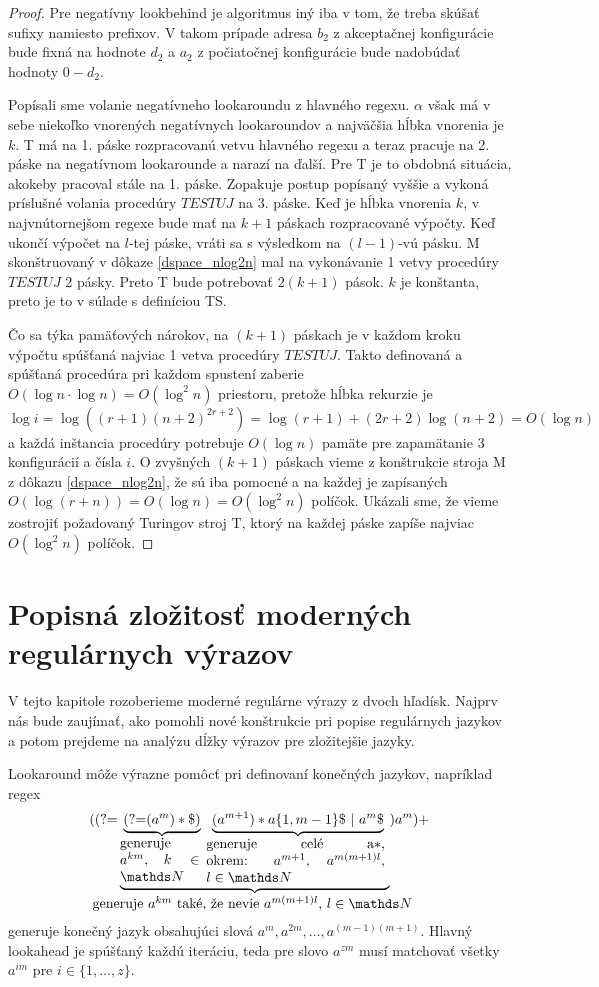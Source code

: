 \begin{proof}
Pre negatívny lookbehind je algoritmus iný iba v tom, že treba skúšať sufixy namiesto prefixov. V takom prípade adresa $b_2$ z akceptačnej konfigurácie bude fixná na hodnote $d_2$ a $a_2$ z počiatočnej konfigurácie bude nadobúdať hodnoty $0-d_2$.

Popísali sme volanie negatívneho lookaroundu z hlavného regexu. $\alpha$ však má v sebe niekoľko vnorených negatívnych lookaroundov a najväčšia hĺbka vnorenia je $k$. T má na 1. páske rozpracovanú vetvu hlavného regexu a teraz pracuje na 2. páske na negatívnom lookarounde a narazí na ďalší. Pre T je to obdobná situácia, akokeby pracoval stále na 1. páske. Zopakuje postup popísaný vyššie a vykoná príslušné volania procedúry $TESTUJ$ na 3. páske. Keď je hĺbka vnorenia $k$, v najvnútornejšom regexe bude mať na $k+1$ páskach rozpracované výpočty. Keď ukončí výpočet na $l$-tej páske, vráti sa s výsledkom na $(l-1)$-vú pásku. M skonštruovaný v dôkaze \ref{dspace_nlog2n} mal na vykonávanie 1 vetvy procedúry $TESTUJ$ 2 pásky. Preto T bude potrebovať $2(k+1)$ pások. $k$ je konštanta, preto je to v súlade s definíciou TS.

Čo sa týka pamäťových nárokov, na $(k+1)$ páskach je v každom kroku výpočtu spúšťaná najviac 1 vetva procedúry $TESTUJ$. Takto definovaná a spúšťaná procedúra pri každom spustení zaberie $O(\log n\cdot\log n) = O(\log ^2 n)$ priestoru, pretože hĺbka rekurzie je $$\log i = \log ((r+1)(n+2)^{2r+2}) = \log (r+1) + (2r+2)\log (n+2) = O(\log n)$$ a každá inštancia procedúry potrebuje $O(\log n)$ pamäte pre zapamätanie 3 konfigurácií a čísla $i$. O zvyšných $(k+1)$ páskach vieme z konštrukcie stroja M z dôkazu \ref{dspace_nlog2n}, že sú iba pomocné a na každej je zapísaných $O(\log (r+n)) = O(\log n) = O(\log^2 n)$ políčok. Ukázali sme, že vieme zostrojiť požadovaný Turingov stroj T, ktorý na každej páske zapíše najviac $O(\log^2 n)$ políčok.
\end{proof}

\section[Popisná zložitosť]{Popisná zložitosť moderných regulárnych výrazov}
\label{vzlozitost}

V tejto kapitole rozoberieme moderné regulárne výrazy z dvoch hľadísk. Najprv nás bude zaujímať, ako pomohli nové konštrukcie pri popise regulárnych jazykov a potom prejdeme na analýzu dĺžky výrazov pre zložitejšie jazyky.

Lookaround môže výrazne pomôcť pri definovaní konečných jazykov, napríklad regex 
$$(\lookahead 
\underbrace{
	\underbrace{
		\lookahead (a^m)*\$ )
	}_{ \text{\normalsize \parbox{2cm}{generuje $a^{km}$, $k\in\N$} } }
	\underbrace{
		(a^{m+1})* a\lbrace 1,m-1\rbrace \$ ~|~ a^m \$ 
	}_{ \text{\normalsize \parbox{4.5cm}{generuje celé a$*$, okrem: $a^{m+1}$, $a^{m(m+1)l}$, $l\in\N$} } }
}_{\mathclap{ \text{\normalsize generuje $a^{km}$ také, že nevie $a^{m(m+1)l}$, $l\in\N$ } } }
) a^m)+$$
generuje konečný jazyk obsahujúci slová $a^m,\allowbreak a^{2m},\dots,\allowbreak a^{(m-1)(m+1)}$. Hlavný lookahead je spúšťaný každú iteráciu, teda pre slovo $a^{zm}$ musí matchovať všetky $a^{im}$ pre $i\in\lbrace 1,\dots,z\rbrace$.
